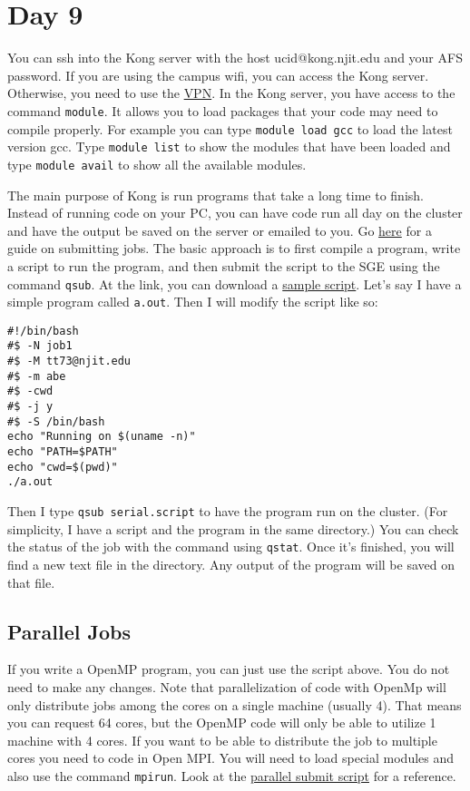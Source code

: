 \documentclass{article}
\begin{document}
\section{Day 9}
You can ssh into the Kong server with the host ucid@kong.njit.edu and your AFS password. If you are using the campus wifi, you can access the Kong server. Otherwise, you need to use the \href{https://ist.njit.edu/vpn/}{VPN}. In the Kong server, you have access to the command \texttt{module}. It allows you to load packages that your code may need to compile properly. For example you can type \texttt{module load gcc} to load the latest version gcc. Type \texttt{module list} to show the modules that have been loaded and type \texttt{module avail} to show all the available modules.

The main purpose of Kong is run programs that take a long time to finish. Instead of running code on your PC, you can have code run all day on the cluster and have the output be saved on the server or emailed to you. Go \href{https://wiki.hpc.arcs.njit.edu/index.php/SonOfGridEngine}{here} for a guide on submitting jobs. The basic approach is to first compile a program, write a script to run the program, and then submit the script to the SGE using the command \texttt{qsub}. At the link, you can download a \href{https://wiki.hpc.arcs.njit.edu/external/serial.script}{sample script}. Let's say I have a simple program called \texttt{a.out}. Then I will modify the script like so:
\begin{verbatim}
#!/bin/bash
#$ -N job1
#$ -M tt73@njit.edu
#$ -m abe
#$ -cwd
#$ -j y
#$ -S /bin/bash
echo "Running on $(uname -n)"
echo "PATH=$PATH"
echo "cwd=$(pwd)"
./a.out
\end{verbatim}
Then I type \texttt{qsub serial.script} to have the program run on the cluster. (For simplicity, I have a script and the program in the same directory.) You can check the status of the job with the command using \texttt{qstat}. Once it's finished, you will find a new text file in the directory. Any output of the program will be saved on that file.

\subsection{Parallel Jobs}
If you write a OpenMP program, you can just use the script above. You do not need to make any changes. Note that parallelization of code with OpenMp will only distribute jobs among the cores on a single machine (usually 4). That means you can request 64 cores, but the OpenMP code will only be able to utilize 1 machine with 4 cores. If you want to be able to distribute the job to multiple cores you need to code in Open MPI. You will need to load special modules and also use the command \texttt{mpirun}. Look at the \href{https://wiki.hpc.arcs.njit.edu/external/parallel.script}{parallel submit script} for a reference.
\end{document}
